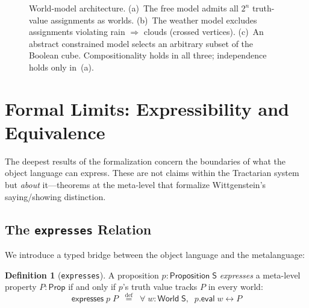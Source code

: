 \documentclass[10pt, letterpaper]{article}
\theoremstyle{definition}
\newtheorem{definition}[theorem]{Definition}
\theoremstyle{remark}
\newcommand{\Sach}{\mathsf{S}}
\newcommand{\World}{\mathsf{World}}
\newcommand{\Prop}{\mathsf{Prop}}
\newcommand{\eval}{\mathsf{eval}}
\newcommand{\expresses}{\mathsf{expresses}}
\begin{document}
\begin{figure}[t]
\caption{World-model architecture. (a)~The free model admits all
  $2^n$ truth-value assignments as worlds. (b)~The weather model
  excludes assignments violating rain $\Rightarrow$ clouds
  (crossed vertices). (c)~An abstract constrained model selects
  an arbitrary subset of the Boolean cube.  Compositionality
  holds in all three; independence holds only in~(a).}
\label{fig:worldmodels}
\end{figure}

\section{Formal Limits: Expressibility and Equivalence}
\label{sec:limits}

The deepest results of the formalization concern the boundaries
of what the object language can express.  These are not claims
within the Tractarian system but \emph{about} it---theorems at
the meta-level that formalize Wittgenstein's saying/showing
distinction.

\subsection{The \texttt{expresses} Relation}
\label{sec:expresses}

We introduce a typed bridge between the object language and the
metalanguage:

\begin{definition}[\texttt{expresses}]
\label{def:expresses}
A proposition $p : \mathsf{Proposition}\;\Sach$ \emph{expresses}
a meta-level property $P : \Prop$ if and only if $p$'s truth
value tracks $P$ in every world:
\[
  \expresses\;p\;P \;\;\stackrel{\mathrm{def}}{=}\;\;
  \forall\;w : \World\;\Sach,\;\; p.\eval\;w \leftrightarrow P
\]
\end{definition}
\end{document}
